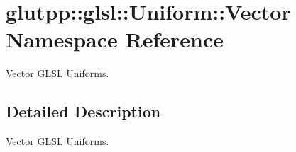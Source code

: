 \hypertarget{namespaceglutpp_1_1glsl_1_1Uniform_1_1Vector}{\section{glutpp\-:\-:glsl\-:\-:\-Uniform\-:\-:\-Vector \-Namespace \-Reference}
\label{namespaceglutpp_1_1glsl_1_1Uniform_1_1Vector}
}


\hyperlink{namespaceglutpp_1_1glsl_1_1Uniform_1_1Vector}{\-Vector} \-G\-L\-S\-L \-Uniforms.  




\subsection{\-Detailed \-Description}
\hyperlink{namespaceglutpp_1_1glsl_1_1Uniform_1_1Vector}{\-Vector} \-G\-L\-S\-L \-Uniforms. 